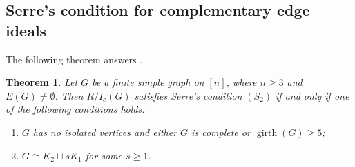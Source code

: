 \documentclass[12pt]{amsart}
\newtheorem{theorem}[proposition]{Theorem}
\begin{document}
\subsection{Serre's condition for complementary edge ideals}\label{sec:serre-s2}

The following theorem answers \cite[Question~2.9]{fm25}.

\begin{theorem}\label{thm:S2}
Let $G$ be a finite simple graph on $[n]$, where $n\geq3$ and $E(G)\neq\emptyset$. Then $R/I_c(G)$ satisfies Serre's condition $(S_2)$ if and only if one of the following conditions holds:
\begin{enumerate}
\item $G$ has no isolated vertices and either $G$ is complete or $\operatorname{girth}(G)\geq5$;
\item $G\cong K_2\sqcup sK_1$ for some $s\geq1$.
\end{enumerate}
\end{theorem}
\end{document}
